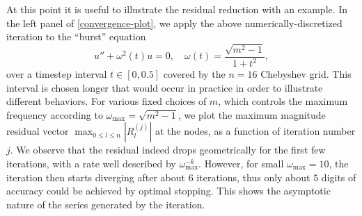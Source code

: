 \documentclass[10pt]{article}
\newcommand{\om}{\omega}
\begin{document}
At this point it is useful to illustrate the residual reduction
with an example.
In the left panel of \cref{convergence-plot}, we apply
the above numerically-discretized iteration to the ``burst'' equation
\begin{equation}\label{bursteq}
  u'' + \om^2(t) u = 0, \quad  \om(t)=\frac{\sqrt{m^2 - 1}}{1+t^2},
\end{equation}
over a timestep interval $t \in [0, 0.5]$ covered by the $n=16$ Chebyshev grid.
This interval is chosen longer that would occur in practice in order
to illustrate different behaviors.
%
For various fixed choices of $m$, which controls
the maximum frequency according to $\om_{\text{max}} = \sqrt{m^2-1}$,
we plot the maximum magnitude residual vector $\max_{0\le l \le n} |R_l^{(j)}|$
at the nodes, as a function of iteration number $j$.
%
We observe that the residual
indeed drops geometrically for the first few iterations,
with a rate well described by $\om_{\text{max}}^{-k}$.
However, for small $\om_{\text{max}}=10$, the iteration
then starts diverging after about $6$
iterations, thus only about $5$ digits of accuracy could be achieved
by optimal stopping.
This shows the asymptotic nature of the series generated by the iteration.
\end{document}
